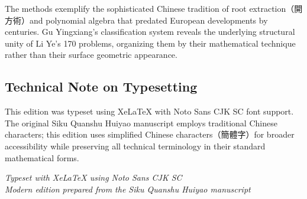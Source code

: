 \documentclass[11pt,a4paper]{article}
\newcounter{problem}[section]
\begin{document}
The methods exemplify the sophisticated Chinese tradition of root extraction（開方術）and polynomial algebra that predated European developments by centuries. Gu Yingxiang's classification system reveals the underlying structural unity of Li Ye's 170 problems, organizing them by their mathematical technique rather than their surface geometric appearance.

\subsection*{Technical Note on Typesetting}
This edition was typeset using XeLaTeX with Noto Sans CJK SC font support. The original Siku Quanshu Huiyao manuscript employs traditional Chinese characters; this edition uses simplified Chinese characters（簡體字）for broader accessibility while preserving all technical terminology in their standard mathematical forms.

\vspace{1cm}
\begin{flushright}
\textit{Typeset with XeLaTeX using Noto Sans CJK SC}\\
\textit{Modern edition prepared from the Siku Quanshu Huiyao manuscript}
\end{flushright}
\end{document}
